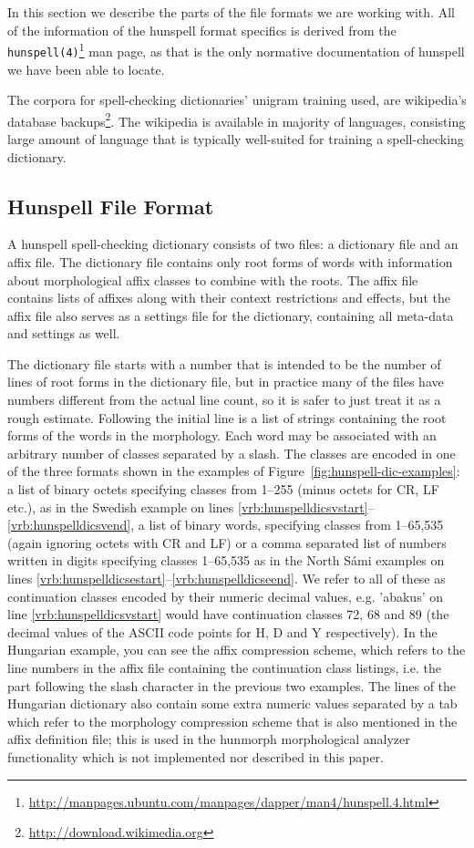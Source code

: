 \documentclass[a4paper,runningheads]{llncs}
\begin{document}
In this section we describe the parts of the file formats we are
working with. All of the information of the hunspell format specifics
is derived from the
\texttt{hunspell(4)}\footnote{\url{http://manpages.ubuntu.com/manpages/dapper/man4/hunspell.4.html}}
man page, as that is the only normative documentation of hunspell we
have been able to locate. 

The corpora for spell-checking dictionaries' unigram training used, are
wikipedia's database backups\footnote{\url{http://download.wikimedia.org}}. The
wikipedia is available in majority of languages, consisting large amount of
language that is typically well-suited for training a spell-checking dictionary.


\subsection{Hunspell File Format}
\label{subsec:material-hunspell}

A hunspell spell-checking dictionary consists of two files: a
dictionary file and an affix file. The dictionary file contains only
root forms of words with information about morphological affix classes
to combine with the roots.  The affix file contains lists of affixes
along with their context restrictions and effects, but the affix file
also serves as a settings file for the dictionary, containing all
meta-data and settings as well.

The dictionary file starts with a number that is intended to be the
number of lines of root forms in the dictionary file, but in practice
many of the files have numbers different from the actual line count,
so it is safer to just treat it as a rough estimate. Following the
initial line is a list of strings containing the root forms of the
words in the morphology. Each word may be associated with an arbitrary
number of classes separated by a slash. The classes are encoded in one
of the three formats shown in the examples of
Figure~\ref{fig:hunspell-dic-examples}: a list of binary octets
specifying classes from 1--255 (minus octets for CR, LF etc.), as in
the Swedish example on lines
\ref{vrb:hunspelldicsvstart}--\ref{vrb:hunspelldicsvend}, a list of
binary words, specifying classes from 1--65,535 (again ignoring octets
with CR and LF) or a comma separated list of numbers written in digits
specifying classes 1--65,535 as in the North Sámi examples on lines
\ref{vrb:hunspelldicsestart}--\ref{vrb:hunspelldicseend}. We refer to
all of these as continuation classes encoded by their numeric decimal
values, e.g. 'abakus' on line \ref{vrb:hunspelldicsvstart} would have
continuation classes 72, 68 and 89 (the decimal values of the ASCII
code points for H, D and Y respectively). In the Hungarian example,
you can see the affix compression scheme, which refers to the line
numbers in the affix file containing the continuation class listings,
i.e. the part following the slash character in the previous two
examples. The lines of the Hungarian dictionary also contain some
extra numeric values separated by a tab which refer to the morphology
compression scheme that is also mentioned in the affix definition
file; this is used in the hunmorph morphological analyzer
functionality which is not implemented nor described in this paper.
\end{document}
